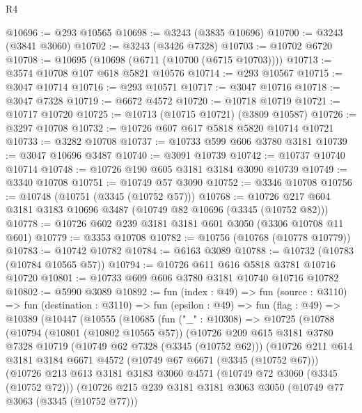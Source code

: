 \begin{lexlean}{R4}
\begin{coremodule}
@10696 := @293 @10565
@10698 := @3243 (@3835 @10696)
@10700 := @3243 (@3841 @3060)
@10702 := @3243 (@3426 @7328)
@10703 := @10702 @6720
@10708 := @10695 (@10698 (@6711 (@10700 (@6715 @10703))))
@10713 := @3574 @10708 @107 @618 @5821 @10576
@10714 := @293 @10567
@10715 := @3047 @10714
@10716 := @293 @10571
@10717 := @3047 @10716
@10718 := @3047 @7328
@10719 := @6672 @4572
@10720 := @10718 @10719
@10721 := @10717 @10720
@10725 := @10713 (@10715 @10721) (@3809 @10587)
@10726 := @3297 @10708
@10732 := @10726 @607 @617 @5818 @5820 @10714 @10721
@10733 := @3282 @10708
@10737 := @10733 @599 @606 @3780 @3181
@10739 := @3047 @10696 @3487
@10740 := @3091 @10739
@10742 := @10737 @10740 @10714
@10748 := @10726 @190 @605 @3181 @3184 @3090 @10739
@10749 := @3340 @10708
@10751 := @10749 @57 @3090
@10752 := @3346 @10708
@10756 := @10748 (@10751 (@3345 (@10752 @57)))
@10768 := @10726 @217 @604 @3181 @3183 @10696 @3487 (@10749 @82 @10696 (@3345 (@10752 @82)))
@10778 := @10726 @602 @239 @3181 @3181 @601 @3050 (@3306 @10708 @11 @601)
@10779 := @3353 @10708
@10782 := @10756 (@10768 (@10778 @10779))
@10783 := @10742 @10782
@10784 := @6163 @3089
@10788 := @10732 (@10783 (@10784 @10565 @57))
@10794 := @10726 @611 @616 @5818 @3781 @10716 @10720
@10801 := @10733 @609 @606 @3780 @3181 @10740 @10716 @10782
@10802 := @5990 @3089
@10892 := fun (index : @49) =>
  fun (source : @3110) =>
  fun (destination : @3110) =>
  fun (epsilon : @49) =>
  fun (flag : @49) =>
  @10389
    (@10447
      (@10555
        (@10685
          (fun ("_" : @10308) =>
          @10725
            (@10788
              (@10794
                (@10801 (@10802 @10565 @57))
                (@10726
                  @209
                  @615
                  @3181
                  @3780
                  @7328
                  @10719
                  (@10749 @62 @7328 (@3345 (@10752 @62)))
                  (@10726
                    @211
                    @614
                    @3181
                    @3184
                    @6671
                    @4572
                    (@10749 @67 @6671 (@3345 (@10752 @67)))
                    (@10726
                      @213
                      @613
                      @3181
                      @3183
                      @3060
                      @4571
                      (@10749 @72 @3060 (@3345 (@10752 @72)))
                      (@10726
                        @215
                        @239
                        @3181
                        @3181
                        @3063
                        @3050
                        (@10749 @77 @3063 (@3345 (@10752 @77)))

\end{coremodule}
\end{lexlean}
